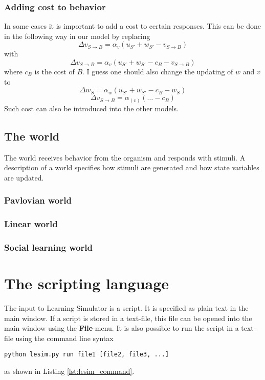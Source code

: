 \documentclass[11pt]{article}
\newcommand{\cmd}[1]{\texttt{#1}}
\begin{document}
\subsubsection{Adding cost to behavior}
In some cases it is important to add a cost to certain responses.
This can be done in the following way in our model by replacing
\[
\Delta v_{S\to B}=\alpha_{v}(u_{S'}+w_{S'}-v_{S\to B})
\]
with 
\[
\Delta v_{S\to B}=\alpha_{v}(u_{S'}+w_{S'}-c_{B}-v_{S\to B})
\]
where $c_{B}$ is the cost of $B$. I guess one should also change the updating of $w$ and $v$ to
\[
\Delta w_{S}=\alpha_{w}(u_{S'}+w_{S'}-c_{B}-w_{S})
\]
\[
\Delta v_{S \to B}= \alpha_{(v)}(\dotsc -c_{B})
\]
Such cost can also be introduced into the other models.

\subsection{The world}
The world receives behavior from the organism and responds with stimuli.
A description of a world specifies how stimuli are generated and how state
variables are updated.

\subsubsection{Pavlovian world}

\subsubsection{Linear world}

\subsubsection{Social learning world}



\section{The scripting language}
The input to Learning Simulator is a script. It is specified as plain text in the main window. If a script is stored in a text-file, this file can be opened into the main window using the \textbf{File}-menu. It is also possible to run the script in a text-file using the command line syntax
\begin{center}
\cmd{python lesim.py run file1 [file2, file3, ...]}
\end{center}
as shown in Listing \ref{lst:lesim_command}.
\end{document}
